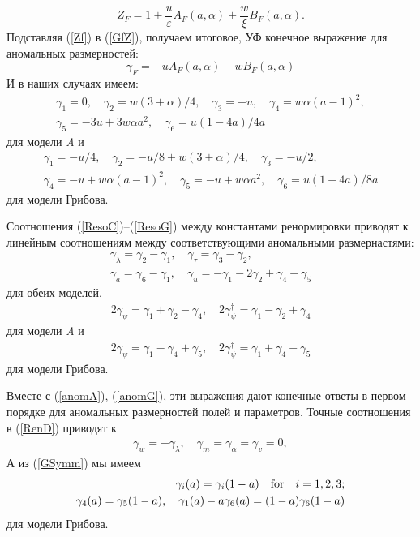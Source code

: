 \documentclass[a4paper,10pt]{article}
\begin{document}
\begin{equation}
Z_{F} = 1 + \frac{u}{\varepsilon} A_{F}(a,\alpha) + \frac{w}{\xi} B_{F}(a,\alpha).
\label{Zf}
\end{equation}
Подставляя (\ref{Zf}) в (\ref{GfZ}), получаем итоговое, УФ конечное выражение для аномальных размерностей:
\begin{equation}
\gamma_{F} = - u A_{F}(a,\alpha) - w B_{F}(a,\alpha)
\label{gift}
\end{equation}
 И в наших случаях имеем:
\begin{eqnarray}
\gamma_{1} = 0, \quad \gamma_{2} = w (3+\alpha)/4, \quad
\gamma_{3} = -u , \quad \gamma_{4} =w \alpha (a-1)^{2} , \nonumber \\
\gamma_{5} =  -3u +3 w \alpha a^{2}, \quad
\gamma_{6} =u(1-4a)/4a
\label{anomA}
\end{eqnarray}
для модели {\it A} и
\begin{eqnarray}
\gamma_{1} = -u/4 , \quad \gamma_{2} = -u/8 + w (3+\alpha)/4, \quad
\gamma_{3} = -u/2 , \nonumber \\
\gamma_{4} = -u + w \alpha (a-1)^{2}, \quad
\gamma_{5} = -u + w \alpha a^{2}, \quad
\gamma_{6} =u(1-4a)/8a
\label{anomG}
\end{eqnarray}
для модели Грибова.

Соотношения (\ref{ResoC})--(\ref{ResoG})
между константами ренормировки приводят к линейным соотношениям между соответствующими аномальными размернастями:
\begin{eqnarray}
\gamma_{\lambda} =  \gamma_{2} -\gamma_{1}, \quad
\gamma_{\tau} =  \gamma_{3} -\gamma_{2} , \nonumber \\
\gamma_{a} =  \gamma_{6} -\gamma_{1}, \quad
\gamma_{u} = -\gamma_{1}- 2\gamma_{2} +\gamma_{4} + \gamma_{5}
\label{aesoC}
\end{eqnarray}
для обеих моделей,
\begin{eqnarray}
2\gamma_{\psi}= \gamma_{1} +\gamma_{2} -\gamma_{4}, \quad
2\gamma_{\psi}^{\dag}= \gamma_{1} - \gamma_{2} + \gamma_{4}
\label{aesoA}
\end{eqnarray}
для модели {\it A} и
\begin{eqnarray}
2\gamma_{\psi}= \gamma_{1}- \gamma_{4} + \gamma_{5}, \quad
2\gamma_{\psi}^{\dag}= \gamma_{1}+ \gamma_{4} -  \gamma_{5}
\label{aesoG}
\end{eqnarray}
для модели Грибова.

Вместе с (\ref{anomA}), (\ref{anomG}), эти выражения дают конечные ответы в первом порядке для аномальных размерностей  полей и параметров.
Точные соотношения в  (\ref{RenD}) приводят к
\begin{eqnarray}
\gamma_{w} =-\gamma_{\lambda}, \quad
\gamma_{m} =\gamma_{\alpha} =\gamma_{v} = 0,
\label{exi}
\end{eqnarray}
А из (\ref{GSymm}) мы имеем
\begin{eqnarray}
\gamma_{i} (a) = \gamma_{i} (1-a) \quad {\rm for} \quad i=1,2,3;
\nonumber \\
\gamma_{4} (a) = \gamma_{5} (1-a), \quad
\gamma_{1} (a) -a \gamma_{6}(a) = (1-a) \gamma_{6}(1-a)
\label{SymmG}
\end{eqnarray}
для модели Грибова.
\end{document}

